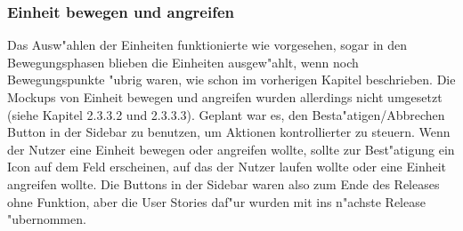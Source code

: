 \documentclass[12pt, titlepage]{scrartcl}
\begin{document}
			\subsubsection{Einheit bewegen und angreifen}
				Das Ausw"ahlen der Einheiten funktionierte wie vorgesehen, sogar in den Bewegungsphasen blieben die Einheiten ausgew"ahlt, wenn noch Bewegungspunkte "ubrig waren, wie schon im vorherigen Kapitel beschrieben. Die Mockups von Einheit bewegen und angreifen wurden allerdings nicht umgesetzt (siehe Kapitel 2.3.3.2 und 2.3.3.3). Geplant war es, den Besta"atigen/Abbrechen Button in der Sidebar zu benutzen, um Aktionen kontrollierter zu steuern. Wenn der Nutzer eine Einheit bewegen oder angreifen wollte, sollte zur Best"atigung ein Icon auf dem Feld erscheinen, auf das der Nutzer laufen wollte oder eine Einheit angreifen wollte. Die Buttons in der Sidebar waren also zum Ende des Releases ohne Funktion, aber die User Stories daf"ur wurden mit ins n"achste Release "ubernommen.
\end{document}

